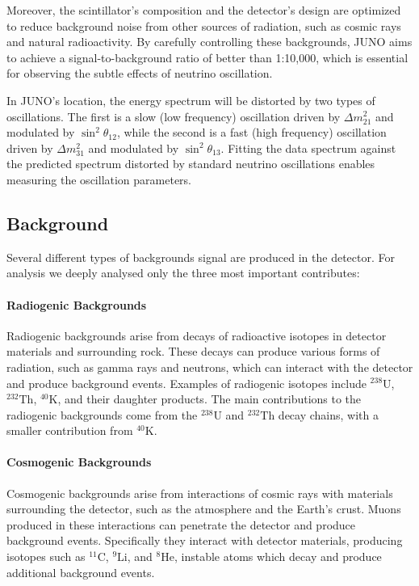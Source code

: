 Moreover, the scintillator's composition and the detector's design are optimized to reduce background noise from other sources of radiation, such as cosmic rays and natural radioactivity. By carefully controlling these backgrounds, JUNO aims to achieve a signal-to-background ratio of better than 1:10,000, which is essential for observing the subtle effects of neutrino oscillation.

In JUNO's location, the energy spectrum will be distorted by two types of oscillations. The first is a slow (low frequency) oscillation driven by $\Delta m_{21}^2$ and modulated by $\sin ^2 \theta_{12}$, while the second is a fast (high frequency) oscillation driven by $\Delta m_{31}^2$ and modulated by $\sin ^2 \theta_{13}$. Fitting the data spectrum against the predicted spectrum distorted by standard neutrino oscillations enables measuring the oscillation parameters.\\
\subsection{Background}
Several different types of backgrounds signal are produced in the detector. For analysis we deeply analysed only the three most important contributes:


\paragraph{Radiogenic Backgrounds}

Radiogenic backgrounds arise from decays of radioactive isotopes in detector materials and surrounding rock. These decays can produce various forms of radiation, such as gamma rays and neutrons, which can interact with the detector and produce background events. Examples of radiogenic isotopes include $^{238}\mathrm{U}$, $^{232}\mathrm{Th}$, $^{40}\mathrm{K}$, and their daughter products. The main contributions to the radiogenic backgrounds come from the $^{238}\mathrm{U}$ and $^{232}\mathrm{Th}$ decay chains, with a smaller contribution from $^{40}\mathrm{K}$.

\paragraph{Cosmogenic Backgrounds}

Cosmogenic backgrounds arise from interactions of cosmic rays with materials surrounding the detector, such as the atmosphere and the Earth's crust. Muons produced in these interactions can penetrate the detector and produce background events. Specifically they interact with detector materials, producing isotopes such as $^{11}\mathrm{C}$, $^{9}\mathrm{Li}$, and $^{8}\mathrm{He}$, instable atoms which decay and produce additional background events.

